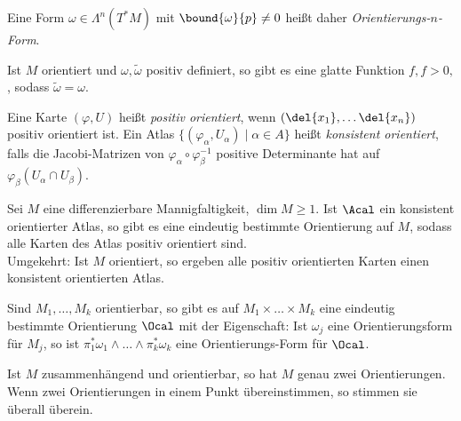 \begin{rem*}
	Eine Form \( \omega \in \Lambda^n(T^*M)\) mit \( \bound{\omega}{p} \neq 0 \) heißt daher \emph{Orientierungs-$n$-Form}.
\end{rem*}

Ist $M$ orientiert und $\omega, \tilde{\omega}$ positiv definiert, so gibt es eine glatte Funktion \( f, f > 0, \), sodass \( \tilde{\omega} = \omega \).

\begin{defn*}
	Eine Karte \( (\varphi,U) \) heißt \emph{positiv orientiert}, wenn \( (\del{x_1}, \dotsc \del{x_n}) \) positiv orientiert ist. Ein Atlas \( \{(\varphi_\alpha, U_\alpha) \mid \alpha \in A\} \) heißt \emph{konsistent orientiert}, falls die Jacobi-Matrizen von \( \varphi_\alpha \circ \varphi_\beta^{-1} \) positive Determinante hat auf \( \varphi_\beta(U_\alpha \cap U_\beta) \).
\end{defn*}

\begin{lem}
	Sei $M$ eine differenzierbare Mannigfaltigkeit, $\dim M \geq 1$. Ist $\Acal$ ein konsistent orientierter Atlas, so gibt es eine eindeutig bestimmte Orientierung auf $M$, sodass alle Karten des Atlas positiv orientiert sind.\\
	Umgekehrt: Ist $M$ orientiert, so ergeben alle positiv orientierten Karten einen konsistent orientierten Atlas.
\end{lem}

\begin{lem}
	Sind \( M_1, \dotsc, M_k \) orientierbar, so gibt es auf \( M_1 \times \dots \times M_k \) eine eindeutig bestimmte Orientierung $\Ocal$ mit der Eigenschaft: Ist $\omega_j$ eine Orientierungsform für $M_j$, so ist \( \pi_1^*\omega_1 \wedge \dots \wedge \pi_k^*\omega_k \) eine Orientierungs-Form für $\Ocal$.
\end{lem}

\begin{lem}
	Ist $M$ zusammenhängend und orientierbar, so hat $M$ genau zwei Orientierungen. Wenn zwei Orientierungen in einem Punkt übereinstimmen, so stimmen sie überall überein.
\end{lem}